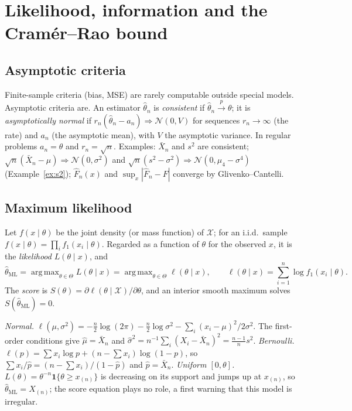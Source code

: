 \documentclass[11pt,a4paper]{article}
\newcommand{\N}{\mathcal{N}}
\newcommand{\cp}{\xrightarrow{\;p\;}}
\newcommand{\cd}{\Rightarrow}
\newcommand{\iid}{i.i.d.}
\newcommand{\one}{\mathbf 1}
\newcommand{\Xbar}{\bar X_n}
\newcommand{\Fn}{\widehat F_n}
\newcommand{\thml}{\hat\theta_{\mathrm{ML}}}
\DeclareMathOperator*{\argmax}{arg\,max}
\begin{document}
\section{Likelihood, information and the Cram\'er--Rao bound}\label{sec:cr}

\subsection{Asymptotic criteria}

Finite-sample criteria (bias, MSE) are rarely computable outside special models. Asymptotic criteria are. An estimator $\hat\theta_n$ is \emph{consistent} if $\hat\theta_n\cp\theta$; it is \emph{asymptotically normal} if $r_n(\hat\theta_n-a_n)\cd\N(0,V)$ for sequences $r_n\to\infty$ (the rate) and $a_n$ (the asymptotic mean), with $V$ the asymptotic variance. In regular problems $a_n=\theta$ and $r_n=\sqrt n$. Examples: $\Xbar$ and $s^2$ are consistent; $\sqrt n(\Xbar-\mu)\cd\N(0,\sigma^2)$ and $\sqrt n(s^2-\sigma^2)\cd\N(0,\mu_4-\sigma^4)$ (Example~\ref{ex:s2}); $\Fn(x)$ and $\sup_x|\Fn-F|$ converge by Glivenko--Cantelli.

\subsection{Maximum likelihood}

Let $f(x\mid\theta)$ be the joint density (or mass function) of $\mathcal X$; for an \iid\ sample $f(x\mid\theta)=\prod_if_1(x_i\mid\theta)$. Regarded as a function of $\theta$ for the observed $x$, it is the \emph{likelihood} $L(\theta\mid x)$, and
\[
\thml=\argmax_{\theta\in\Theta}L(\theta\mid x)=\argmax_{\theta\in\Theta}\ell(\theta\mid x),\qquad\ell(\theta\mid x)=\sum_{i=1}^n\log f_1(x_i\mid\theta).
\]
The \emph{score} is $S(\theta)=\partial\ell(\theta\mid\mathcal X)/\partial\theta$, and an interior smooth maximum solves $S(\thml)=0$.

\begin{example}\label{ex:mles}
\emph{Normal.} $\ell(\mu,\sigma^2)=-\frac n2\log(2\pi)-\frac n2\log\sigma^2-\sum_i(x_i-\mu)^2/2\sigma^2$. The first-order conditions give $\hat\mu=\Xbar$ and $\hat\sigma^2=n^{-1}\sum_i(X_i-\Xbar)^2=\frac{n-1}{n}s^2$. \emph{Bernoulli.} $\ell(p)=\sum x_i\log p+(n-\sum x_i)\log(1-p)$, so $\sum x_i/\hat p=(n-\sum x_i)/(1-\hat p)$ and $\hat p=\Xbar$. \emph{Uniform $[0,\theta]$.} $L(\theta)=\theta^{-n}\one\{\theta\ge x_{(n)}\}$ is decreasing on its support and jumps up at $x_{(n)}$, so $\thml=X_{(n)}$; the score equation plays no role, a first warning that this model is irregular.
\end{example}
\end{document}
